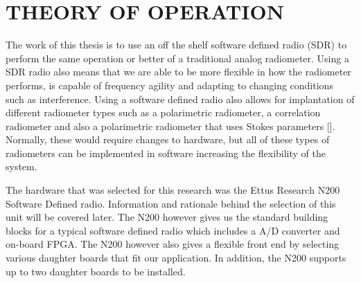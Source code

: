 

\chapter{THEORY OF OPERATION}

The work of this thesis is to use an off the shelf software defined radio (SDR) to perform the same operation or better of a traditional analog radiometer.  Using a SDR radio also means that we are able to be more flexible in how the radiometer performs, is capable of frequency agility and adapting to changing conditions such as interference.  Using a software defined radio also allows for implantation of different radiometer types such as a polarimetric radiometer, a correlation radiometer and also a polarimetric radiometer that uses Stokes parameters [\cite{Wang}].  Normally, these would require changes to hardware, but all of these types of radiometers can be implemented in software increasing the flexibility of the system.  

The hardware that was selected for this research was the Ettus Research N200 Software Defined radio.  Information and rationale behind the selection of this unit will be covered later.  The N200 however gives us the standard building blocks for a typical software defined radio which includes a A/D converter and on-board FPGA.  The N200 however also gives a flexible front end by selecting various daughter boards that fit our application.  In addition, the N200 supports up to two daughter boards to be installed.  

